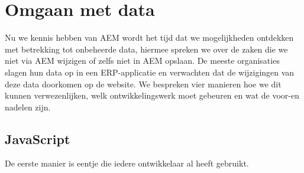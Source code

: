 \documentclass{article}
\begin{document}
	\section{Omgaan met data}
	Nu we kennis hebben van AEM wordt het tijd dat we mogelijkheden ontdekken met betrekking tot onbeheerde data, hiermee spreken we over de zaken die we niet via AEM wijzigen of zelfs niet in AEM opslaan. De meeste organisaties slagen hun data op in een ERP-applicatie en verwachten dat de wijzigingen van deze data doorkomen op de website. We bespreken vier manieren hoe we dit kunnen verwezenlijken, welk ontwikkelingswerk moet gebeuren en wat de voor-en nadelen zijn.
	
	\subsection{JavaScript} 
	De eerste manier is eentje die iedere ontwikkelaar al heeft gebruikt.
\end{document}
